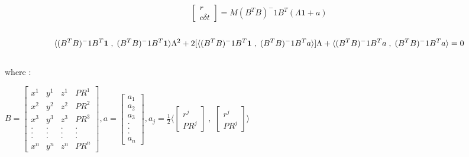 \documentclass[12pt]{article}
\begin{document}
\begin{equation}
  \begin{bmatrix}
     r\\
     c\delta t
    
\end{bmatrix} = M(B^{T}B)^-1B^{T}(\Lambda\textbf{1}+a)
\end{equation}\\
\footnotesize {\begin{equation}
\langle (B^{T}B)^-1B^{T} \textbf{1} \; , \; (B^{T}B)^-1B^{T} \textbf{1} \rangle \Lambda^2 + \\
2[\langle (B^{T}B)^-1B^{T} \textbf{1} \; , \; (B^{T}B)^-1B^{T} a \rangle]\Lambda+\\
\langle (B^{T}B)^-1B^{T} a \; , \; (B^{T}B)^-1B^{T} a \rangle = 0
\end{equation}}\\
where : \\
\begin{center}
$B =  \begin{bmatrix}
     x^1 & y^1 & z^1 & PR^1\\
     x^2 & y^2 & z^2 & PR^2\\
     x^3 & y^3 & z^3 & PR^3\\
     . & . & . & .\\
     . & . & . & .\\
     . & . & . & .\\
     x^n & y^n & z^n & PR^n
    
\end{bmatrix} , a = \begin{bmatrix}
     a_1\\
     a_2\\
     a_3\\
     .\\
     .\\
     .\\
     a_n
\end{bmatrix} , a_j =\frac{1}{2} \langle \begin{bmatrix}
     r^j\\
     PR^j
\end{bmatrix} \; , \; \begin{bmatrix}
     r^j\\
     PR^j
\end{bmatrix}  \rangle$
\end{center}
\end{document}
